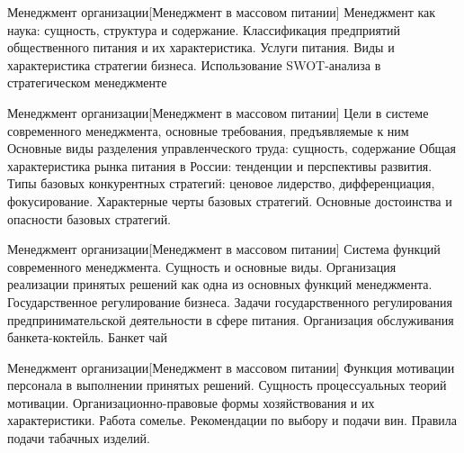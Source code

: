 \documentclass[
	11pt,
	a4paper,
	]
	{article}
\begin{document}
\vfill



\begin{minipage}[t][\miniH]{\miniL}\centering
	 {Менеджмент организации}[Менеджмент в массовом питании]
		{
			Менеджмент как наука: сущность, структура и содержание.
		}{
			Классификация предприятий общественного питания и их характеристика. Услуги питания.
		}{
			Виды и характеристика стратегии бизнеса. Использование SWOT-анализа в стратегическом менеджменте
		}
	\lowGE
\end{minipage}

\vfill



\begin{minipage}[t][\miniH]{\miniL}\centering
	 {Менеджмент организации}[Менеджмент в массовом питании]
		{
			Цели в системе современного менеджмента, основные требования, предъявляемые к ним Основные виды разделения управленческого труда: сущность, содержание
		}{
			Общая характеристика рынка питания в России: тенденции и перспективы развития.
		}{
			Типы базовых конкурентных стратегий: ценовое лидерство, дифференциация, фокусирование. Характерные черты базовых стратегий. Основные достоинства и опасности базовых стратегий.
		}
	\lowGE
\end{minipage}





\begin{minipage}[t][\miniH]{\miniL}\centering
	 {Менеджмент организации}[Менеджмент в массовом питании]
		{
			Система функций современного менеджмента. Сущность и основные виды. Организация реализации принятых решений как одна из основных функций менеджмента.
		}{
			Государственное регулирование бизнеса. Задачи государственного регулирования предпринимательской деятельности в сфере питания.
		}{
			Организация обслуживания банкета-коктейль. Банкет чай
		}
	\lowGE
\end{minipage}

\vfill



\begin{minipage}[t][\miniH]{\miniL}\centering
	 {Менеджмент организации}[Менеджмент в массовом питании]
		{
			Функция мотивации персонала в выполнении принятых решений. Сущность процессуальных теорий мотивации.
		}{
			Организационно-правовые формы хозяйствования и их характеристики.
		}{
			Работа сомелье. Рекомендации по выбору и подачи вин. Правила подачи табачных изделий.
		}
	\lowGE
\end{minipage}
\end{document}
